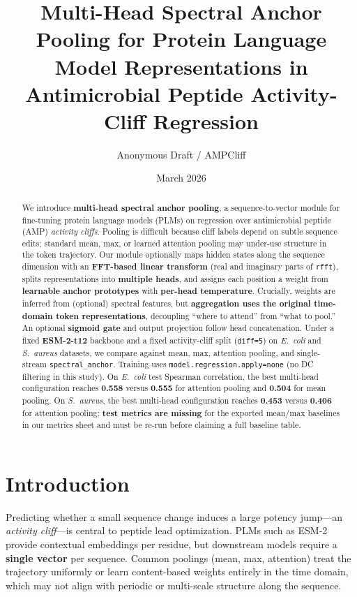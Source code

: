\documentclass[11pt]{article}
\title{Multi-Head Spectral Anchor Pooling for Protein Language Model Representations in Antimicrobial Peptide Activity-Cliff Regression}
\author{Anonymous Draft / AMPCliff}
\date{March 2026}
\begin{document}
\maketitle

\begin{abstract}
We introduce \textbf{multi-head spectral anchor pooling}, a sequence-to-vector module for fine-tuning protein language models (PLMs) on regression over antimicrobial peptide (AMP) \emph{activity cliffs}. Pooling is difficult because cliff labels depend on subtle sequence edits; standard mean, max, or learned attention pooling may under-use structure in the token trajectory. Our module optionally maps hidden states along the sequence dimension with an \textbf{FFT-based linear transform} (real and imaginary parts of \texttt{rfft}), splits representations into \textbf{multiple heads}, and assigns each position a weight from \textbf{learnable anchor prototypes} with \textbf{per-head temperature}. Crucially, weights are inferred from (optional) spectral features, but \textbf{aggregation uses the original time-domain token representations}, decoupling ``where to attend'' from ``what to pool.'' An optional \textbf{sigmoid gate} and output projection follow head concatenation. Under a fixed \textbf{ESM-2-t12} backbone and a fixed activity-cliff split (\texttt{diff=5}) on \textit{E.~coli} and \textit{S.~aureus} datasets, we compare against mean, max, attention pooling, and single-stream \texttt{spectral\_anchor}. Training uses \texttt{model.regression.apply=none} (no DC filtering in this study). On \textit{E.~coli} test Spearman correlation, the best multi-head configuration reaches \textbf{0.558} versus \textbf{0.555} for attention pooling and \textbf{0.504} for mean pooling. On \textit{S.~aureus}, the best multi-head configuration reaches \textbf{0.453} versus \textbf{0.406} for attention pooling; \textbf{test metrics are missing} for the exported mean/max baselines in our metrics sheet and must be re-run before claiming a full baseline table.
\end{abstract}

\section{Introduction}
Predicting whether a small sequence change induces a large potency jump---an \emph{activity cliff}---is central to peptide lead optimization. PLMs such as ESM-2 provide contextual embeddings per residue, but downstream models require a \textbf{single vector} per sequence. Common poolings (mean, max, attention) treat the trajectory uniformly or learn content-based weights entirely in the time domain, which may not align with periodic or multi-scale structure along the sequence.
\end{document}
